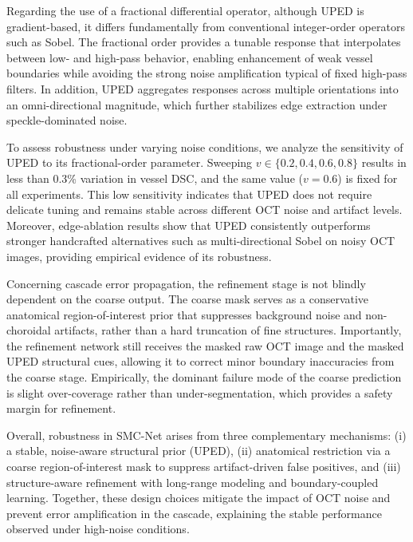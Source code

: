 \documentclass[11pt]{article}
\begin{document}
\begin{enumerate}
{    Regarding the use of a fractional differential operator, although UPED is gradient-based, it differs fundamentally from conventional integer-order operators such as Sobel. The fractional order provides a tunable response that interpolates between low- and high-pass behavior, enabling enhancement of weak vessel boundaries while avoiding the strong noise amplification typical of fixed high-pass filters. In addition, UPED aggregates responses across multiple orientations into an omni-directional magnitude, which further stabilizes edge extraction under speckle-dominated noise.

    To assess robustness under varying noise conditions, we analyze the sensitivity of UPED to its fractional-order parameter. Sweeping $v\in\{0.2,0.4,0.6,0.8\}$ results in less than 0.3\% variation in vessel DSC, and the same value ($v=0.6$) is fixed for all experiments. This low sensitivity indicates that UPED does not require delicate tuning and remains stable across different OCT noise and artifact levels. Moreover, edge-ablation results show that UPED consistently outperforms stronger handcrafted alternatives such as multi-directional Sobel on noisy OCT images, providing empirical evidence of its robustness.

    Concerning cascade error propagation, the refinement stage is not blindly dependent on the coarse output. The coarse mask serves as a conservative anatomical region-of-interest prior that suppresses background noise and non-choroidal artifacts, rather than a hard truncation of fine structures. Importantly, the refinement network still receives the masked raw OCT image and the masked UPED structural cues, allowing it to correct minor boundary inaccuracies from the coarse stage. Empirically, the dominant failure mode of the coarse prediction is slight over-coverage rather than under-segmentation, which provides a safety margin for refinement.

    Overall, robustness in SMC-Net arises from three complementary mechanisms: (i) a stable, noise-aware structural prior (UPED), (ii) anatomical restriction via a coarse region-of-interest mask to suppress artifact-driven false positives, and (iii) structure-aware refinement with long-range modeling and boundary-coupled learning. Together, these design choices mitigate the impact of OCT noise and prevent error amplification in the cascade, explaining the stable performance observed under high-noise conditions.
    }


\end{enumerate}
\end{document}
